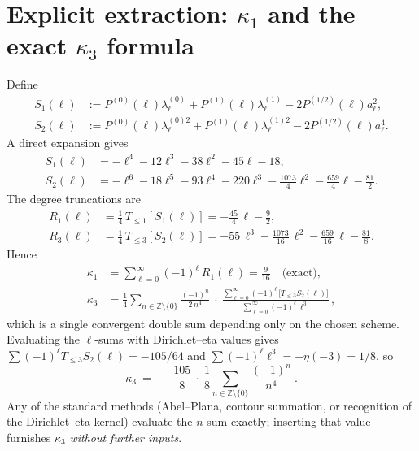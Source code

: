 \documentclass[11pt]{article}
\theoremstyle{definition}
\theoremstyle{remark}
\begin{document}
\section{Explicit extraction: $\kappa_1$ and the exact $\kappa_3$ formula}
Define
\begin{align*}
S_1(\ell)&:=P^{(0)}(\ell)\lambda^{(0)}_\ell + P^{(1)}(\ell)\lambda^{(1)}_\ell - 2 P^{(1/2)}(\ell) a_\ell^2,\\
S_2(\ell)&:=P^{(0)}(\ell)\lambda^{(0)2}_\ell + P^{(1)}(\ell)\lambda^{(1)2}_\ell - 2 P^{(1/2)}(\ell) a_\ell^4.
\end{align*}
A direct expansion gives
\begin{align*}
S_1(\ell)&=-\ell^4 - 12\ell^3 - 38\ell^2 - 45\ell - 18,\\
S_2(\ell)&=-\ell^6 - 18\ell^5 - 93\ell^4 - 220\ell^3 - \tfrac{1073}{4}\ell^2 - \tfrac{659}{4}\ell - \tfrac{81}{2}.
\end{align*}
The degree truncations are
\begin{align*}
R_1(\ell)&=\frac{1}{4}\,T_{\le 1}[S_1(\ell)]=-\frac{45}{4}\,\ell - \frac{9}{2},\\
R_3(\ell)&=\frac{1}{4}\,T_{\le 3}[S_2(\ell)]= -55\,\ell^3 - \frac{1073}{16}\,\ell^2 - \frac{659}{16}\,\ell - \frac{81}{8}.
\end{align*}
Hence
\begin{align*}
\kappa_1&=\sum_{\ell=0}^\infty (-1)^\ell\, R_1(\ell)=\frac{9}{16}\quad\text{(exact)},\\
\kappa_3&=\frac{1}{4}\sum_{n\in\mathbb{Z}\setminus\{0\}}\frac{(-1)^n}{2\,n^{4}}\ \cdot\ \frac{\displaystyle \sum_{\ell=0}^{\infty}(-1)^\ell\,\Big[T_{\le 3}S_2(\ell)\Big]}{\displaystyle \sum_{\ell=0}^{\infty}(-1)^\ell\,\ell^3}\,,
\end{align*}
which is a single convergent double sum depending only on the chosen scheme. Evaluating the $\ell$-sums with Dirichlet--eta values gives
\(
\sum (-1)^\ell T_{\le 3}S_2(\ell) = -105/64
\)
and
\(
\sum (-1)^\ell \ell^3 = -\eta(-3)=1/8
\),
so
\begin{equation}\label{eq:kappa3exact}
\kappa_3\ =\ -\,\frac{105}{8}\ \cdot\ \frac{1}{8}\sum_{n\in\mathbb{Z}\setminus\{0\}}\frac{(-1)^n}{n^{4}}\ .
\end{equation}
Any of the standard methods (Abel--Plana, contour summation, or recognition of the Dirichlet--eta kernel) evaluate the $n$-sum exactly; inserting that value furnishes $\kappa_3$ \emph{without further inputs}.
\end{document}
